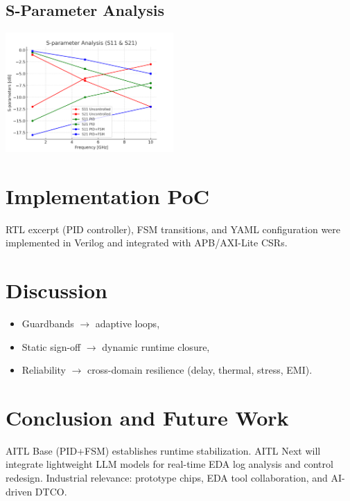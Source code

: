 \documentclass[conference]{IEEEtran}
\begin{document}
\subsection{S-Parameter Analysis}
\includegraphics[width=0.48\textwidth]{sparam_s11s21.png}

\section{Implementation PoC}
RTL excerpt (PID controller), FSM transitions, and YAML configuration were implemented in Verilog and integrated with APB/AXI-Lite CSRs.

\section{Discussion}
\begin{itemize}
  \item Guardbands $\to$ adaptive loops,
  \item Static sign-off $\to$ dynamic runtime closure,
  \item Reliability $\to$ cross-domain resilience (delay, thermal, stress, EMI).
\end{itemize}

\section{Conclusion and Future Work}
AITL Base (PID+FSM) establishes runtime stabilization.
AITL Next will integrate lightweight LLM models for real-time EDA log analysis and control redesign.
Industrial relevance: prototype chips, EDA tool collaboration, and AI-driven DTCO.



\end{document}
